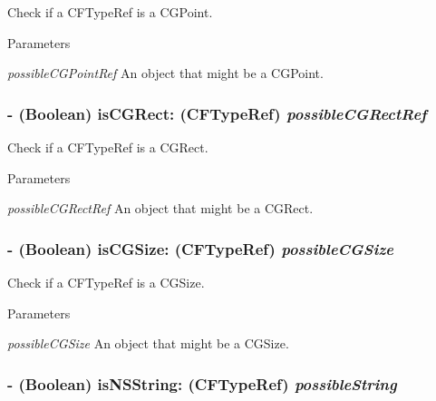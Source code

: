 Check if a CFTypeRef is a CGPoint. 
\begin{DoxyParams}{Parameters}
\item[{\em possibleCGPointRef}]An object that might be a CGPoint. \end{DoxyParams}
\hypertarget{interface_g_d_accessibility_manager_ad8efe9efcd0f371e78166652a64a726b}{
\subsubsection[{isCGRect:}]{\setlength{\rightskip}{0pt plus 5cm}-\/ (Boolean) isCGRect: (CFTypeRef) {\em possibleCGRectRef}}}
\label{interface_g_d_accessibility_manager_ad8efe9efcd0f371e78166652a64a726b}


Check if a CFTypeRef is a CGRect. 
\begin{DoxyParams}{Parameters}
\item[{\em possibleCGRectRef}]An object that might be a CGRect. \end{DoxyParams}
\hypertarget{interface_g_d_accessibility_manager_ae1536a4ac65421f4f50d44adbc992683}{
\subsubsection[{isCGSize:}]{\setlength{\rightskip}{0pt plus 5cm}-\/ (Boolean) isCGSize: (CFTypeRef) {\em possibleCGSize}}}
\label{interface_g_d_accessibility_manager_ae1536a4ac65421f4f50d44adbc992683}


Check if a CFTypeRef is a CGSize. 
\begin{DoxyParams}{Parameters}
\item[{\em possibleCGSize}]An object that might be a CGSize. \end{DoxyParams}
\hypertarget{interface_g_d_accessibility_manager_a7383e6153121e98d5c0a7b1a01705f50}{
\subsubsection[{isNSString:}]{\setlength{\rightskip}{0pt plus 5cm}-\/ (Boolean) isNSString: (CFTypeRef) {\em possibleString}}}
\label{interface_g_d_accessibility_manager_a7383e6153121e98d5c0a7b1a01705f50}


